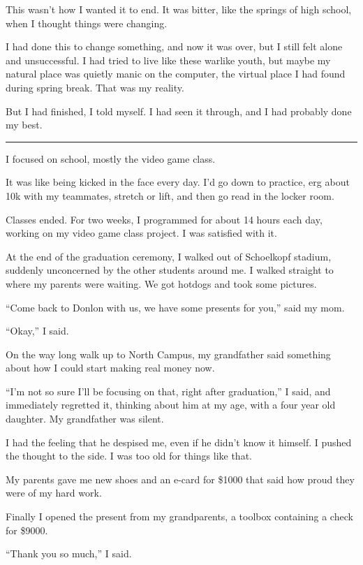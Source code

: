 This wasn't how I wanted it to end.  It was bitter, like the springs of high
school, when I thought things were changing.  

I had done this to change something, and now it was over, but I still felt alone
and unsuccessful.  I had tried to live like these warlike youth, but maybe my
natural place was quietly manic on the computer, the virtual place I had found
during spring break.  That was my reality.

But I had finished, I told myself.  I had seen it through, and I had probably
done my best.

\plainfancybreak{12pt}{2}{}

I focused on school, mostly the video game class.

It was like being kicked in the face every day.  I'd go down to practice, erg
about 10k with my teammates, stretch or lift, and then go read in the locker
room.

Classes ended.  For two weeks, I programmed for about 14 hours each day, working
on my video game class project.  I was satisfied with it.

At the end of the graduation ceremony, I walked out of Schoelkopf stadium,
suddenly unconcerned by the other students around me.  I walked straight to
where my parents were waiting.  We got hotdogs and took some pictures.  

``Come back to Donlon with us, we have some presents for you,'' said my mom. 

``Okay,'' I said.  

On the way long walk up to North Campus, my grandfather said something about how
I could start making real money now.

``I'm not so sure I'll be focusing on that, right after graduation,'' I said,
and immediately regretted it, thinking about him at my age, with a four year old
daughter.  My grandfather was silent.  

I had the feeling that he despised me, even if he didn't know it himself.  I
pushed the thought to the side.  I was too old for things like that.

My parents gave me new shoes and an e-card for \$1000 that said how proud they
were of my hard work.  

Finally I opened the present from my grandparents, a toolbox containing a check
for \$9000.  

``Thank you so much,'' I said.

